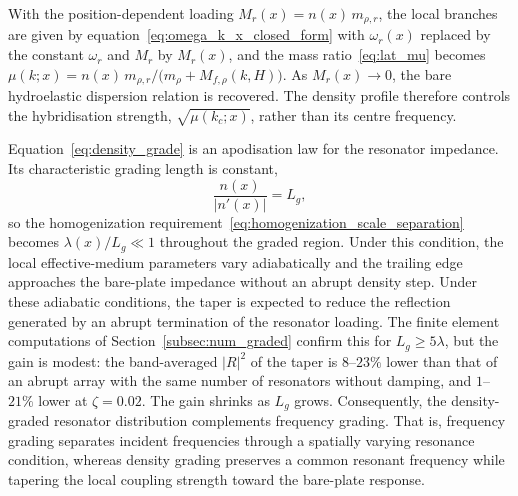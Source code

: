 With the position-dependent loading $M_r(x)=n(x)\,m_{\rho,r}$, the local branches are given by equation~\eqref{eq:omega_k_x_closed_form} with $\omega_r(x)$ replaced by the constant $\omega_r$ and $M_r$ by $M_r(x)$, and the mass ratio~\eqref{eq:lat_mu} becomes $\mu(k;x)=n(x)\,m_{\rho,r}/\big(m_\rho+M_{f,\rho}(k,H)\big)$. As $M_r(x)\to0$, the bare hydroelastic dispersion relation is recovered. The density profile therefore controls the hybridisation strength, $\sqrt{\mu(k_c;x)}$, rather than its centre frequency.

Equation~\eqref{eq:density_grade} is an apodisation law for the resonator impedance. Its characteristic grading length is constant,
\begin{equation}
    \frac{n(x)}{|n'(x)|}=L_g,
\end{equation}
so the homogenization requirement~\eqref{eq:homogenization_scale_separation} becomes $\lambda(x)/L_g\ll1$ throughout the graded region. Under this condition, the local effective-medium parameters vary adiabatically and the trailing edge approaches the bare-plate impedance without an abrupt density step. Under these adiabatic conditions, the taper is expected to reduce the reflection generated by an abrupt termination of the resonator loading{\color{red}. The finite element computations of Section~\ref{subsec:num_graded} confirm this for $L_g\ge5\lambda$, but the gain is modest: the band-averaged $|R|^2$ of the taper is $8$--$23\%$ lower than that of an abrupt array with the same number of resonators without damping, and $1$--$21\%$ lower at $\zeta=0.02$. The gain shrinks as $L_g$ grows.}
 Consequently, the density-graded resonator distribution complements frequency grading. That is, frequency grading separates incident frequencies through a spatially varying resonance condition, whereas density grading preserves a common resonant frequency while tapering the local coupling strength toward the bare-plate response.
 

